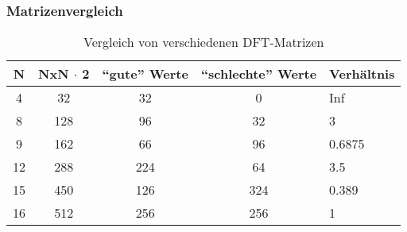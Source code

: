\usebackgroundtemplate{}
\begin{frame}[plain]
	\titlepage
	\hfill
	\begin{center}
	\end{center}
\end{frame}


	\begin{frame}\frametitle{Matrizenvergleich}

	\begin{table}\caption{Vergleich von verschiedenen DFT-Matrizen}
	  \begin{tabular}{ccccl}
	    \toprule
	    N & NxN $\cdot$ 2 & ``gute'' Werte & ``schlechte'' Werte & Verhältnis\\
	    \midrule
	    4  & 32  & 32  &   0 & Inf\\
	    8  & 128 & 96  &  32 & 3\\
	    9  & 162 & 66  &  96 & 0.6875\\
	    12 & 288 & 224 &  64 & 3.5\\
	    15 & 450 & 126 & 324 & 0.389\\
	    16 & 512 & 256 & 256 & 1\\
	    \bottomrule
	  \end{tabular}
	 \end{table}

	 
	\end{frame}
	
